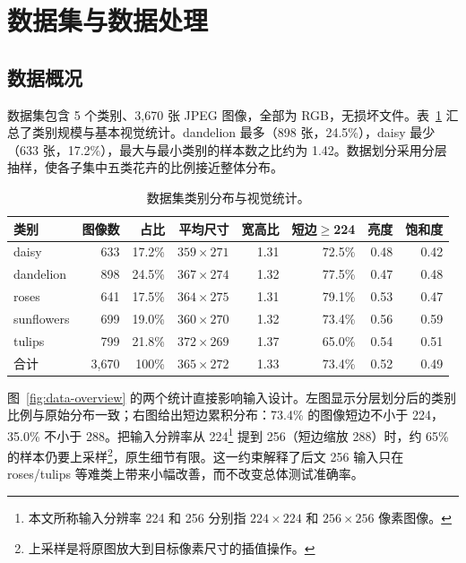 \documentclass[11pt,a4paper,UTF8,fontset=windows]{ctexart}
\begin{document}
\section{数据集与数据处理}
\label{sec:data}

\subsection{数据概况}

数据集包含 5 个类别、3{,}670 张 JPEG 图像，全部为 RGB，无损坏文件。表~\ref{tab:stats} 汇总了类别规模与基本视觉统计。dandelion 最多（898 张，24.5\%），daisy 最少（633 张，17.2\%），最大与最小类别的样本数之比约为 1.42。数据划分采用分层抽样，使各子集中五类花卉的比例接近整体分布。

\begin{table}[htbp]
\centering
\small
\caption{数据集类别分布与视觉统计。}
\label{tab:stats}

\begin{tabular}{lrrrrrrr}
\toprule
类别 & 图像数 & 占比 & 平均尺寸 & 宽高比 & 短边$\geq$224 & 亮度 & 饱和度 \\
\midrule
daisy      & 633 & 17.2\% & $359\times271$ & 1.31 & 72.5\% & 0.48 & 0.42 \\
dandelion  & 898 & 24.5\% & $367\times274$ & 1.32 & 77.5\% & 0.47 & 0.48 \\
roses      & 641 & 17.5\% & $364\times275$ & 1.31 & 79.1\% & 0.53 & 0.47 \\
sunflowers & 699 & 19.0\% & $360\times270$ & 1.32 & 73.4\% & 0.56 & 0.59 \\
tulips     & 799 & 21.8\% & $372\times269$ & 1.37 & 65.0\% & 0.54 & 0.51 \\
\midrule
合计       & 3{,}670 & 100\% & $365\times272$ & 1.33 & 73.4\% & 0.52 & 0.49 \\
\bottomrule
\end{tabular}


\end{table}

图~\ref{fig:data-overview} 的两个统计直接影响输入设计。左图显示分层划分后的类别比例与原始分布一致；右图给出短边累积分布：73.4\% 的图像短边不小于 224，35.0\% 不小于 288。把输入分辨率从 224\footnote{本文所称输入分辨率 224 和 256 分别指 $224\times224$ 和 $256\times256$ 像素图像。} 提到 256（短边缩放 288）时，约 65\% 的样本仍要上采样\footnote{上采样是将原图放大到目标像素尺寸的插值操作。}，原生细节有限。这一约束解释了后文 256 输入只在 roses/tulips 等难类上带来小幅改善，而不改变总体测试准确率。
\end{document}
